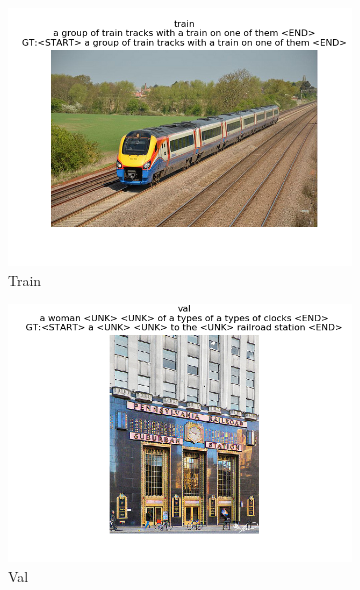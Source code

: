\documentclass[12pt]{article}
\begin{document}
\begin{figure}[htbp]
\begin{subfigure}[t]{0.48\textwidth}
        \centering
        \includegraphics[trim={3in 0in 3in 0in},scale=0.5]{./Homework2/output/hw2p5_fig08.png}
        \caption{Train}
    \label{hw2p5h}
    \end{subfigure}
    \begin{subfigure}[t]{0.48\textwidth}
        \centering
        \includegraphics[trim={3in 0in 3in 0in},scale=0.5]{./Homework2/output/hw2p5_fig09.png}
        \caption{Val}
    \label{hw2p5i}
    \end{subfigure}
    \begin{subfigure}[t]{0.48\textwidth}
        \centering

\end{subfigure}
\end{figure}
\end{document}
